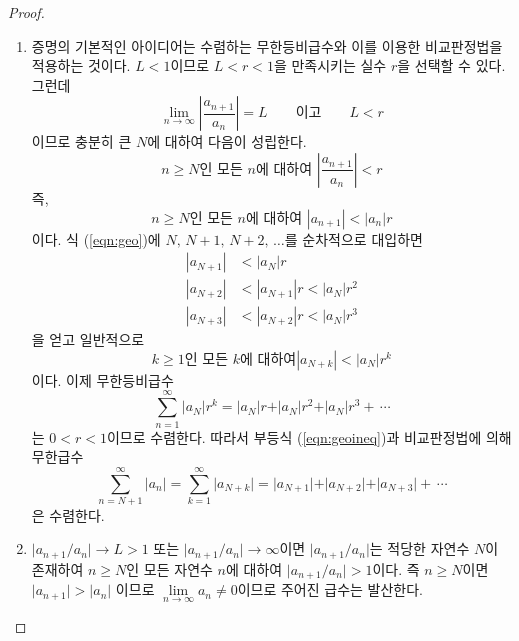 \documentclass[11pt, a4paper]{book}
\begin{document}
\begin{proof}
	\begin{enumerate}[label=(\arabic*)]
		\item 증명의 기본적인 아이디어는 수렴하는 무한등비급수와 이를 이용한 비교판정법을 적용하는 것이다. $L<1$이므로 $L<r<1$을 만족시키는 실수 $r$을 선택할 수 있다. 그런데 
		\begin{equation*}
			\displaystyle \lim\limits_{n\to \infty}\left|\frac{a_{n+1}}{a_{n}}\right| =L \qquad \text{이고} \qquad L<r
		\end{equation*}
	이므로 충분히 큰 $N$에 대하여 다음이 성립한다.
	\begin{equation*}
		n \ge N \text{인 모든 }n \text{에 대하여 } \left|\frac{a_{n+1}}{a_{n}}\right| <r
	\end{equation*}
즉,
\begin{equation}\label{eqn:geo}
	n \ge N \text{인 모든 }n \text{에 대하여 } \left|a_{n+1}\right| < \left|a_{n}\right| r
\end{equation}
이다. 식 (\ref{eqn:geo})에 $N, \,N+1, \, N+2,\, \ldots$를 순차적으로 대입하면
\begin{align*}
	\left|a_{N+1}\right| &< \left|a_{N}\right| r\\
		\left|a_{N+2}\right| &< \left|a_{N+1}\right| r < \left|a_{N}\right| r^{2}\\
			\left|a_{N+3}\right| &< \left|a_{N+2}\right| r < \left|a_{N}\right| r^{3}
\end{align*}
을 얻고 일반적으로 
\begin{equation}\label{eqn:geoineq}
	k \ge 1\text{인 모든 } k\text{에 대하여} \left|a_{N+k}\right| < \left|a_{N}\right| r^{k}
\end{equation}
이다. 이제 무한등비급수
\begin{equation*}
	\sum_{n=1}^{\infty}\vert a_N \vert r^{k} = \vert a_N \vert r + \vert a_N \vert r^2 + \vert a_N \vert r^3 + \, \cdots 
\end{equation*}
는 $0<r<1$이므로 수렴한다. 따라서 부등식 (\ref{eqn:geoineq})과 비교판정법에 의해 무한급수
\begin{equation*}
	\sum_{n=N+1}^{\infty}\vert a_n \vert =\sum_{k=1}^{\infty}\vert a_{N+k} \vert = \vert a_{N+1} \vert + \vert a_{N+2} \vert + \vert a_{N+3} \vert +\, \cdots 
\end{equation*}
은 수렴한다.
	\item $\vert a_{n+1}/a_{n} \vert \to L>1$ 또는 $\vert a_{n+1}/a_{n} \vert \to \infty$이면 $\vert a_{n+1}/a_{n} \vert$는 적당한 자연수 $N$이 존재하여 $n \ge N$인 모든 자연수 $n$에 대하여 $\vert a_{n+1}/a_{n} \vert >1$이다. 즉 $n \ge N$이면 $\vert a_{n+1}\vert > \vert a_{n} \vert$
이므로 $\lim\limits_{n \to \infty}a_{n} \neq 0$이므로 주어진 급수는 발산한다.
	\end{enumerate}
\end{proof}
\end{document}
